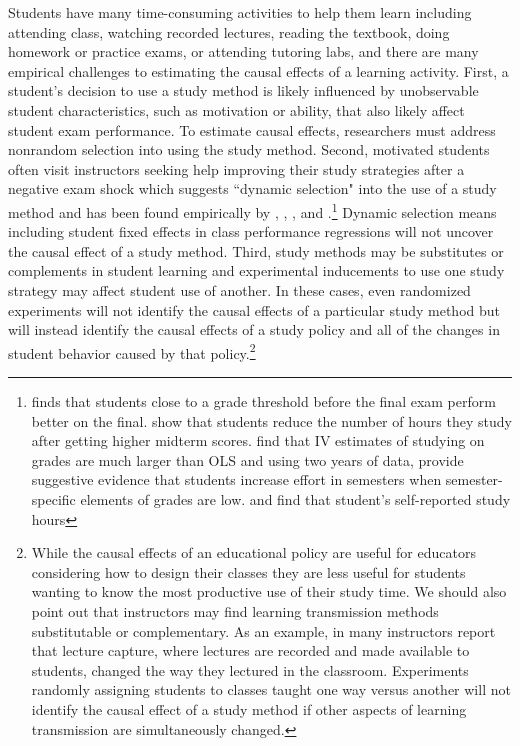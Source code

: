\documentclass[12pt]{article}
\begin{document}
Students have many time-consuming activities to help them learn including attending class, watching recorded lectures, reading the textbook, doing homework or practice exams, or attending tutoring labs, and there are many empirical challenges to estimating the causal effects of a learning activity. First, a student's decision to use a study method is likely influenced by unobservable student characteristics, such as motivation or ability, that also likely affect student exam performance. To estimate causal effects, researchers must address nonrandom selection into using the study method. Second, motivated students often visit instructors seeking help improving their study strategies after a negative exam shock which suggests ``dynamic selection" into the use of a study method and has been found empirically by \textcite{oettinger2002}, \textcite{ko2005}, \textcite{ss2008}, \textcite{bo2012} and \textcite{bo2015}.\footnote{\textcite{oettinger2002} finds that students close to a grade threshold before the final exam perform better on the final. \textcite{ko2005} show that students reduce the number of hours they study after getting higher midterm scores. \textcite{ss2008} find that IV estimates of studying on grades are much larger than OLS and using two years of data, provide suggestive evidence that students increase effort in semesters when semester-specific elements of grades are low. \textcite{bo2012} and \textcite{bo2015} find that student's self-reported study hours } %
Dynamic selection means including student fixed effects in class performance regressions will not uncover the causal effect of a study method. Third, study methods may be substitutes or complements in student learning and experimental inducements to use one study strategy may affect student use of another. In these cases, even randomized experiments will not identify the causal effects of a particular study method but will instead identify the causal effects of a study policy and all of the changes in student behavior caused by that policy.\footnote{While the causal effects of an educational policy are useful for educators considering how to design their classes they are less useful for students wanting to know the most productive use of their study time. We should also point out that instructors may find learning transmission methods substitutable or complementary. As an example, in \textcite{msc2019} many instructors report that lecture capture, where lectures are recorded and made available to students, changed the way they lectured in the classroom. Experiments randomly assigning students to classes taught one way versus another will not identify the causal effect of a study method if other aspects of learning transmission are simultaneously changed.} %
\end{document}
